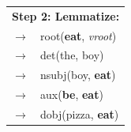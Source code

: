 \documentclass[xcolor={dvipsnames}]{beamer}
\begin{document}
\begin{frame}
\begin{columns}
\pause
{}
\begin{table}
\begin{tabular}{cl}
\multicolumn{2}{c}{\textbf{Step 2: Lemmatize:}} \\
$\rightarrow$ & root(\textbf{eat}, \textit{vroot}) \\
$\rightarrow$ & det(the, boy) \\
$\rightarrow$ & nsubj(boy, \textbf{eat}) \\
$\rightarrow$ & aux(\textbf{be}, \textbf{eat}) \\
$\rightarrow$ & dobj(pizza, \textbf{eat}) \\
\end{tabular}
\end{table}


\end{columns}

\end{frame}
\end{document}

